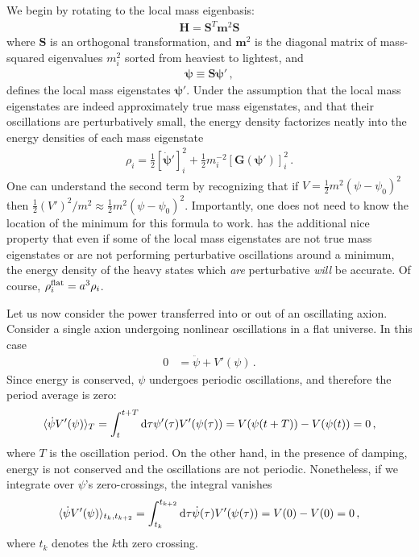 \documentclass{article}
\begin{document}
We begin by rotating to the local mass eigenbasis:
\begin{align}
    \bm H = \bm S^T \bm m^2 \bm S
\end{align}
where $\bm S$ is an orthogonal transformation, and $\bm m^2$ is the diagonal matrix of mass-squared eigenvalues $m_i^2$ sorted from heaviest to lightest, and 
\begin{align}
    \bm\psi\equiv \bm S{\bm\psi}'\,,
\end{align}
defines the local mass eigenstates $\bm\psi'$.
Under the assumption that the local mass eigenstates are indeed approximately true mass eigenstates, and that their oscillations are perturbatively small, the energy density factorizes neatly into the energy densities of each mass eigenstate
\begin{align}\label{eqn:local_energy_density}
    \rho_i = \frac12 [\dot{\bm\psi}']_i^2 + \frac12m_i^{-2}[\bm G(\bm\psi')]_i^2\,.
\end{align}
One can understand the second term by recognizing that if $V = \frac12m^2(\psi - \psi_0)^2$ then $\frac12(V')^2/m^2\approx \frac12m^2(\psi-\psi_0)^2$. Importantly, one does not need to know the location of the minimum for this formula to work.  has the additional nice property that even if some of the local mass eigenstates are not true mass eigenstates or are not performing perturbative oscillations around a minimum, the energy density of the heavy states which \emph{are} perturbative \emph{will} be accurate. Of course, $\rho_i^{\rm flat} = a^3\rho_i$.

Let us now consider the power transferred into or out of an oscillating axion. Consider a single axion undergoing nonlinear oscillations in a flat universe. In this case
\begin{align}\label{eqn:single_axion}
    0&=\ddot\psi + V'(\psi)\,.
\end{align}
Since energy is conserved, $\psi$ undergoes periodic oscillations, and therefore the period average is zero:
\begin{align}
    \langle\dot\psi V'(\psi)\rangle_T = \int_t^{t + T}{\rm d}\tau \psi'(\tau)V'(\psi(\tau)) = V(\psi(t + T)) - V(\psi(t)) = 0\,,
\end{align}
where $T$ is the oscillation period.
On the other hand, in the presence of damping, energy is not conserved and the oscillations are not periodic. Nonetheless, if we integrate over $\psi$'s zero-crossings, the integral vanishes
\begin{align}
    \langle\dot\psi V'(\psi)\rangle_{t_k,t_{{k + 2}}} = \int_{t_k}^{t_{k + 2}}{\rm d}\tau \dot\psi(\tau) V'(\psi(\tau)) = V(0) - V(0) = 0\,,
\end{align}
where $t_k$ denotes the $k$th zero crossing.
\end{document}
